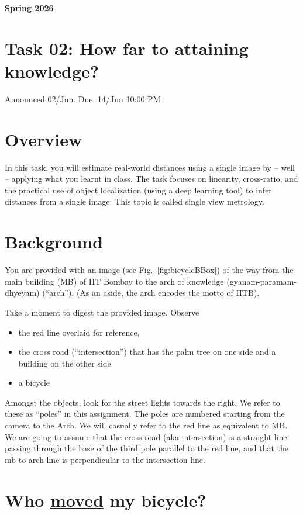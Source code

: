 \documentclass[11pt]{article}
\newcommand{\semester}{Spring 2026}
\newcommand{\titleline}[1]{\noindent\large\textbf{#1}}
\newcommand{\exhead}[1]{\section*{#1}}
\begin{document}
\titleline{\semester}
\exhead{Task 02: How far to attaining knowledge?}

Announced 02/Jun. Due: 14/Jun 10:00 PM


\section{Overview}

In this task, you will estimate real-world distances using a single
image by -- well -- applying what you learnt in class. The task
focuses on  linearity, cross-ratio, and the practical use
of object localization (using a  deep learning tool) to infer
distances from a single image. This topic is called single view metrology.

\section{Background}

You are provided with an image (see Fig.~\ref{fig:bicycleBBox}) of
the way from the main building
(MB) of IIT Bombay to the arch of knowledge (gyanam-paramam-dhyeyam) (``arch''). (As an aside, the arch encodes the motto of IITB).

Take a moment to digest the provided image. Observe
\begin{itemize} 
\item the red line overlaid for reference, 
\item the cross road (``intersection'') that has the palm tree on one side and a building
on the other side
\item a bicycle
\end{itemize}

Amongst the  objects, look for the street lights  towards the right. We refer to these as 
``poles'' in this assignment. The poles are numbered starting from the camera to the Arch. We will casually refer to the red line as equivalent to MB.
We are
going to assume that the cross road (aka intersection)  is a straight line passing
through the base of the third pole parallel to the red
line, and that the mb-to-arch line is perpendicular to
the intersection line.

\section{Who \href{https://en.wikipedia.org/wiki/Who_Moved_My_Cheese\%3F}{moved} my bicycle?}%
\end{document}

